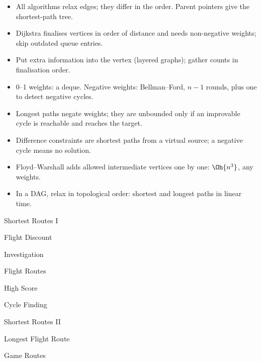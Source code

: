 \begin{summary}
\begin{itemize}
  \item All algorithms relax edges; they differ in the order. Parent pointers give the shortest-path tree.
  \item Dijkstra finalises vertices in order of distance and needs non-negative weights; skip outdated queue entries.
  \item Put extra information into the vertex (layered graphs); gather counts in finalisation order.
  \item 0--1 weights: a deque. Negative weights: Bellman--Ford, $n - 1$ rounds, plus one to detect negative cycles.
  \item Longest paths negate weights; they are unbounded only if an improvable cycle is reachable and reaches the target.
  \item Difference constraints are shortest paths from a virtual source; a negative cycle means no solution.
  \item Floyd--Warshall adds allowed intermediate vertices one by one: $\Oh{n^3}$, any weights.
  \item In a DAG, relax in topological order: shortest and longest paths in linear time.
\end{itemize}
\end{summary}

\begin{practice}
\begin{pplist}
  \item Shortest Routes I
  \item Flight Discount
  \item Investigation
  \item Flight Routes
  \item High Score
  \item Cycle Finding
\end{pplist}
\begin{pplist}
  \item Shortest Routes II
  \item Longest Flight Route
  \item Game Routes
\end{pplist}
\end{practice}
